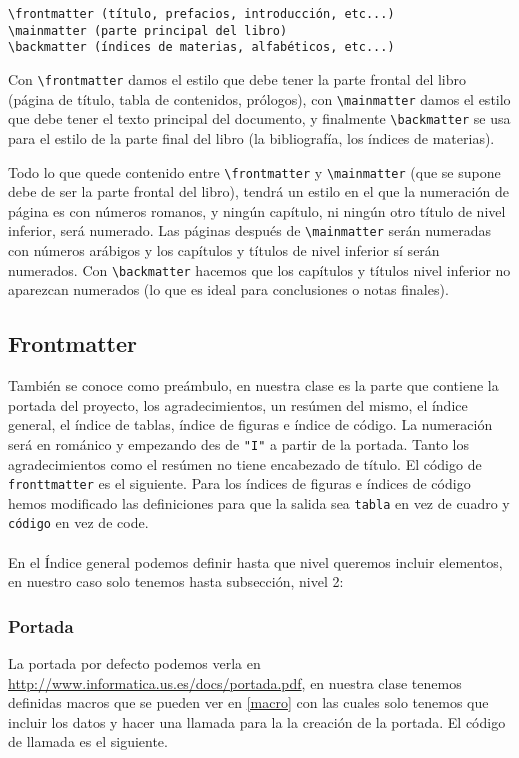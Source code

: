 \begin{verbatim}
\frontmatter (título, prefacios, introducción, etc...)
\mainmatter (parte principal del libro)
\backmatter (índices de materias, alfabéticos, etc...)
\end{verbatim}
Con \verb|\frontmatter| damos el estilo que debe tener la parte frontal del libro (página de título, tabla de contenidos, prólogos), con \verb|\mainmatter| damos el estilo que debe tener el texto principal del documento, y finalmente \verb|\backmatter| se usa para el estilo de la parte final del libro (la bibliografía, los índices de materias).

Todo lo que quede contenido entre \verb|\frontmatter| y \verb|\mainmatter| (que se supone debe de ser la parte frontal del libro), tendrá un estilo en el que la numeración de página es con números romanos, y ningún capítulo, ni ningún otro título de nivel inferior, será numerado. Las páginas después de \verb|\mainmatter| serán numeradas con números arábigos y los capítulos y títulos de nivel inferior sí serán numerados. Con \verb|\backmatter| hacemos que los capítulos y títulos nivel inferior no aparezcan numerados (lo que es ideal para conclusiones o notas finales).
 

	\subsection{Frontmatter}
También se conoce como preámbulo, en nuestra clase es la parte que contiene la portada del proyecto, los agradecimientos,  un resúmen del mismo, el índice general, el índice de tablas, índice de figuras e índice de código. La numeración será en románico y empezando des de \verb|"I"| a partir de la portada. Tanto los agradecimientos como el resúmen no tiene encabezado de título. El código de \verb|fronttmatter| es el siguiente.
Para los índices de figuras e índices de código hemos modificado las definiciones para que la salida sea \verb|tabla| en vez de cuadro y \verb|código| en vez de code.\\
\\
En el Índice general podemos definir hasta que nivel queremos incluir elementos, en nuestro caso solo tenemos hasta subsección, nivel 2:

	\subsubsection{Portada}
La portada por defecto podemos verla en \url{http://www.informatica.us.es/docs/portada.pdf}, en nuestra clase tenemos definidas macros que se pueden ver en \ref{macro} con las cuales solo tenemos que incluir los datos y hacer una llamada para la la creación de la portada. El código de llamada es el siguiente.
	\pagebreak
	
